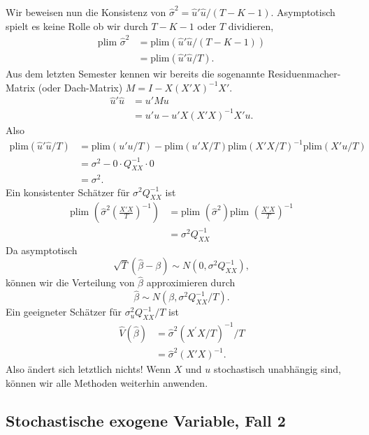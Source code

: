 \documentclass{article}
\begin{document}
Wir beweisen nun die Konsistenz von $\hat{\sigma}^{2}=\hat{u}'\hat{u}/(T-K-1)$. 
Asymptotisch spielt es keine Rolle ob wir durch $T-K-1$ oder $T$ dividieren,
\begin{align*}
\textrm{plim }\hat{\sigma}^{2} &=\textrm{plim}\left( \hat{u}'\hat{u}/\left( T-K-1\right) \right) \\
&=\textrm{plim}\left( \hat{u}'\hat{u}/T\right) .
\end{align*}
Aus dem letzten Semester kennen wir bereits die sogenannte 
Residuenmacher-Matrix (oder Dach-Matrix) $M=I-X(X'X)^{-1}X'$. 
\begin{align*}
\hat{u}'\hat{u} &= u'Mu \\
&=u'u-u'X\left( X'X\right) ^{-1}X'u.
\end{align*}
Also
\begin{align*}
\textrm{plim}\left( \hat{u}'\hat{u}/T\right) &=\textrm{plim}\left( u'u/T\right) -\textrm{plim}\left( u'X/T\right) 
\textrm{plim}\left( X'X/T\right) ^{-1}\textrm{plim}\left(X'u/T\right) \\
&=\sigma^2-0\cdot Q_{XX}^{-1}\cdot 0 \\
&=\sigma^2.
\end{align*}
Ein konsistenter Schätzer für $\sigma ^{2}Q_{XX}^{-1}$ ist
\begin{align*}
\textrm{plim }\left( \hat{\sigma}^{2}\left( \frac{X'X}{T}\right)^{-1}\right) 
&=\textrm{plim }\left( \hat{\sigma}^{2}\right) \textrm{plim }\left( \frac{X'X}{T}\right) ^{-1} \\
&=\sigma ^{2}Q_{XX}^{-1}
\end{align*}
Da asymptotisch 
\[ \sqrt{T}\left( \hat\beta-\beta \right) \sim N\left( 0,\sigma^{2}Q_{XX}^{-1}\right), \]
können wir die Verteilung von $\hat\beta$ approximieren durch
\[ \hat\beta\sim N\left( \beta ,\sigma ^{2}Q_{XX}^{-1}/T\right) .\]
Ein geeigneter Schätzer für $\sigma _{u}^{2}Q_{XX}^{-1}/T$ ist
\begin{align*}
\hat{V}(\hat\beta) &=\hat{\sigma}^{2}\left( X^{\prime}X/T\right) ^{-1}/T \\
&=\hat{\sigma}^{2}\left( X'X\right) ^{-1}.
\end{align*}
Also ändert sich letztlich nichts! Wenn $X$ und $u$ stochastisch unabhängig
sind, können wir alle Methoden weiterhin anwenden.

\subsection*{Stochastische exogene Variable, Fall 2}
\end{document}
